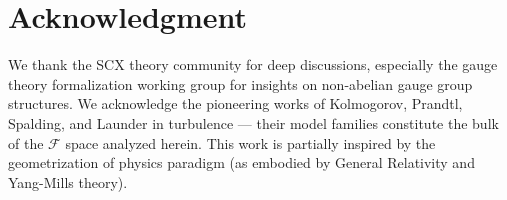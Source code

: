 \documentclass[12pt,a4paper]{article}
\theoremstyle{plain}
\theoremstyle{definition}
\theoremstyle{remark}
\newcommand{\F}{\mathcal{F}}
\begin{document}
\section*{Acknowledgment}
We thank the SCX theory community for deep discussions, especially the gauge theory formalization working group for insights on non-abelian gauge group structures. We acknowledge the pioneering works of Kolmogorov, Prandtl, Spalding, and Launder in turbulence --- their model families constitute the bulk of the $\F$ space analyzed herein. This work is partially inspired by the geometrization of physics paradigm (as embodied by General Relativity and Yang-Mills theory).
\end{document}
